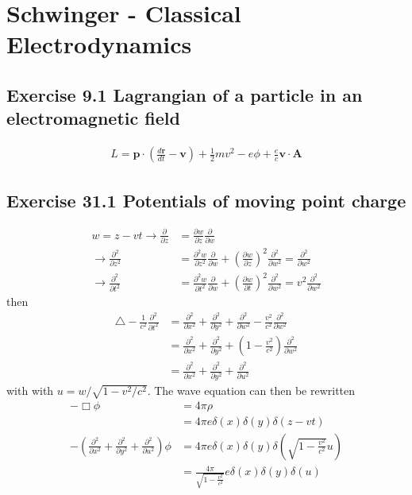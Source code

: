 \documentclass[../main.tex]{subfiles}
\begin{document}
\section{{\sc Schwinger} - Classical Electrodynamics}
\subsection{Exercise 9.1 Lagrangian of a particle in an electromagnetic field}
\begin{align}
L=\mathbf{p}\cdot\left(\frac{d\mathbf{r}}{dt}-\mathbf{v}\right)+\frac{1}{2}mv^2-e\phi+\frac{e}{c}\mathbf{v}\cdot\mathbf{A}
\end{align}


\subsection{Exercise 31.1 Potentials of moving point charge}
\begin{align}
    w=z-vt
    \rightarrow
    \frac{\partial}{\partial z}&=\frac{\partial w}{\partial z}\frac{\partial}{\partial w}\\
    \rightarrow\frac{\partial^2}{\partial z^2}&=\frac{\partial^2 w}{\partial z^2}\frac{\partial}{\partial w}+\left(\frac{\partial w}{\partial z}\right)^2\frac{\partial^2}{\partial w^2}=\frac{\partial^2}{\partial w^2}\\
    \rightarrow\frac{\partial^2}{\partial t^2}&=\frac{\partial^2 w}{\partial t^2}\frac{\partial}{\partial w}+\left(\frac{\partial w}{\partial t}\right)^2\frac{\partial^2}{\partial w^2}=v^2\frac{\partial^2}{\partial w^2}
\end{align}
then
\begin{align}
    \triangle-\frac{1}{c^2}\frac{\partial^2}{\partial t^2}&=\frac{\partial^2}{\partial x^2}+\frac{\partial^2}{\partial y^2}+\frac{\partial^2}{\partial w^2}-\frac{v^2}{c^2}\frac{\partial^2}{\partial w^2}\\
    &=\frac{\partial^2}{\partial x^2}+\frac{\partial^2}{\partial y^2}+\left(1-\frac{v^2}{c^2}\right)\frac{\partial^2}{\partial w^2}\\
    &=\frac{\partial^2}{\partial x^2}+\frac{\partial^2}{\partial y^2}+\frac{\partial^2}{\partial u^2}
\end{align}
with with $u=w/\sqrt{1-v^2/c^2}$. The wave equation can then be rewritten
\begin{align}
    -\Box\phi&=4\pi\rho\\
    &=4\pi e\delta(x)\delta(y)\delta(z-vt)\\
    -\left(\frac{\partial^2}{\partial x^2}+\frac{\partial^2}{\partial y^2}+\frac{\partial^2}{\partial u^2}\right)\phi&=4\pi e\delta(x)\delta(y)\delta\left(\sqrt{1-\frac{v^2}{c^2}}u\right)\\
    &=\frac{4\pi}{\sqrt{1-\frac{v^2}{c^2}}} e\delta(x)\delta(y)\delta\left(u\right)
\end{align}
\end{document}
